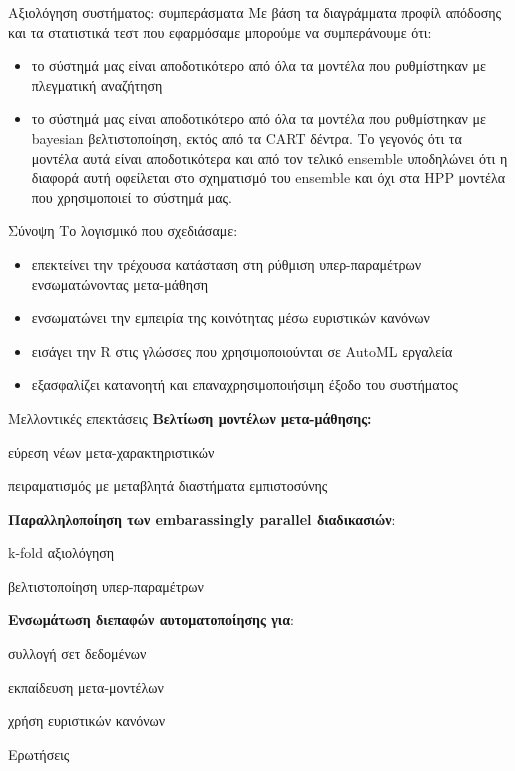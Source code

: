 \documentclass{beamer}
\begin{document}
    \begin{frame}{Αξιολόγηση συστήματος: συμπεράσματα}
    	Με βάση τα διαγράμματα προφίλ απόδοσης και τα στατιστικά τεστ που εφαρμόσαμε μπορούμε να συμπεράνουμε ότι:
    	\begin{itemize}
    		\item το σύστημά μας είναι αποδοτικότερο από όλα τα μοντέλα που ρυθμίστηκαν με πλεγματική αναζήτηση
    		\item το σύστημά μας είναι αποδοτικότερο από όλα τα μοντέλα που ρυθμίστηκαν με bayesian βελτιστοποίηση, εκτός από τα CART δέντρα. Το γεγονός ότι τα μοντέλα αυτά είναι αποδοτικότερα και από τον τελικό ensemble υποδηλώνει ότι η διαφορά αυτή οφείλεται στο σχηματισμό του ensemble και όχι στα HPP μοντέλα που χρησιμοποιεί το σύστημά μας.
    	\end{itemize}
    \end{frame}
  \begin{frame}{Σύνοψη} 
   Το λογισμικό που σχεδιάσαμε: 
  	\begin{itemize}
  		\item επεκτείνει την τρέχουσα κατάσταση στη ρύθμιση υπερ-παραμέτρων ενσωματώνοντας μετα-μάθηση
  		\item ενσωματώνει την εμπειρία της κοινότητας μέσω ευριστικών κανόνων
  		\item εισάγει την R στις γλώσσες που χρησιμοποιούνται σε AutoML εργαλεία
  		\item εξασφαλίζει κατανοητή και επαναχρησιμοποιήσιμη έξοδο του συστήματος 
  	\end{itemize}
  \end{frame}
  \begin{frame}{Μελλοντικές επεκτάσεις} 
  	\textbf{Βελτίωση μοντέλων μετα-μάθησης:}
  	\begin{itemize}
  		{\small
  			 \item εύρεση νέων μετα-χαρακτηριστικών
  			\item πειραματισμός με μεταβλητά διαστήματα εμπιστοσύνης}
  		
  		\end{itemize}  	
  		
  	\textbf{Παραλληλοποίηση των embarassingly parallel διαδικασιών}:
  	\begin{itemize}
  		{\small
  		\item k-fold αξιολόγηση
  		\item βελτιστοποίηση υπερ-παραμέτρων	}
  		 
  	\end{itemize}  	   	  	
  	\textbf{Ενσωμάτωση διεπαφών αυτοματοποίησης για}:
  	\begin{itemize}
  		{\small
  			\item συλλογή σετ δεδομένων
  			\item εκπαίδευση μετα-μοντέλων
  			\item χρήση ευριστικών κανόνων}  		
  	\end{itemize}
  \end{frame}  
  \begin{frame}[standout]{} 
    \begin{center}
    Ερωτήσεις
    \end{center}
  \end{frame}
  \begin{frame}[allowframebreaks]{}
\nocite{*}
\printbibliography[title=Bιβλιογραφία ]
  \end{frame} 
\end{document}
